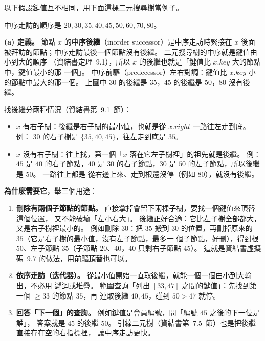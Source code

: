 \begin{pastsoln}
以下假設鍵值互不相同，用下面這棵二元搜尋樹當例子。

\begin{center}
\end{center}
中序走訪的順序是 $20, 30, 35, 40, 45, 50, 60, 70, 80$。

\textbf{(a) 定義。} 節點 $x$ 的\textbf{中序後繼}（inorder successor）是中序走訪時緊接在 $x$
後面被拜訪的節點；中序走訪最後一個節點沒有後繼。 二元搜尋樹的中序就是鍵值由小到大的順序
（資結書定理~9.1），所以 $x$ 的後繼也就是「鍵值比 $x.\mathit{key}$ 大的節點中，鍵值最小的那
一個」。 中序前驅（predecessor）左右對調：鍵值比 $x.\mathit{key}$ 小的節點中最大的那一個。
上圖中 $30$ 的後繼是 $35$，$45$ 的後繼是 $50$，$80$ 沒有後繼。

找後繼分兩種情況（資結書第~9.1~節）：
\begin{itemize}
\item $x$ 有右子樹：後繼是右子樹的最小值，也就是從 $x.\mathit{right}$ 一路往左走到底。 例：
$30$ 的右子樹是 $\{35, 40, 45\}$，往左走到底是 $35$。
\item $x$ 沒有右子樹：往上找，第一個「$x$ 落在它左子樹裡」的祖先就是後繼。 例：$45$ 是 $40$
的右子節點，$40$ 是 $30$ 的右子節點，$30$ 是 $50$ 的左子節點，所以後繼是 $50$。 一路往上都是
從右邊上來、走到根還沒停（例如 $80$），就沒有後繼。
\end{itemize}

\textbf{為什麼需要它}，舉三個用途：
\begin{enumerate}
\item \textbf{刪除有兩個子節點的節點。} 直接拿掉會留下兩棵子樹，要找一個鍵值來頂替這個位置，
又不能破壞「左小右大」。 後繼正好合適：它比左子樹全部都大，又是右子樹裡最小的。 例如刪除
$30$：把 $35$ 搬到 $30$ 的位置，再刪掉原來的 $35$（它是右子樹的最小值，沒有左子節點，最多一
個子節點，好刪），得到根 $50$、左子節點 $35$（子節點 $20$、$40$，$40$ 只剩右子節點 $45$）。
這就是資結書虛擬碼~9.7 的做法，用前驅頂替也可以。
\item \textbf{依序走訪（迭代器）。} 從最小值開始一直取後繼，就能一個一個由小到大輸出，不必用
遞迴或堆疊。 範圍查詢「列出 $[33, 47]$ 之間的鍵值」：先找到第一個 $\ge 33$ 的節點 $35$，再
連取後繼 $40, 45$，碰到 $50 > 47$ 就停。
\item \textbf{回答「下一個」的查詢。} 例如鍵值是會員編號，問「編號 $45$ 之後的下一位是誰」，
答案就是 $45$ 的後繼 $50$。 引線二元樹（資結書第~7.5~節）也是把後繼直接存在空的右指標裡，
讓中序走訪更快。
\end{enumerate}


\end{pastsoln}
